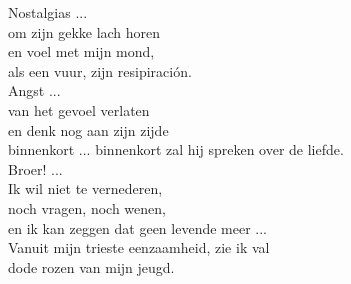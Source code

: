 \begin{translation}
Nostalgias ...\\
om zijn gekke lach horen\\
en voel met mijn mond,\\
als een vuur, zijn resipiración.\\
Angst ...\\
van het gevoel verlaten\\
en denk nog aan zijn zijde\\
binnenkort ... binnenkort zal hij spreken over de liefde.\\
Broer! ...\\
Ik wil niet te vernederen,\\
noch vragen, noch wenen,\\
en ik kan zeggen dat geen levende meer ...\\
Vanuit mijn trieste eenzaamheid, zie ik val\\
dode rozen van mijn jeugd.
\end{translation}
